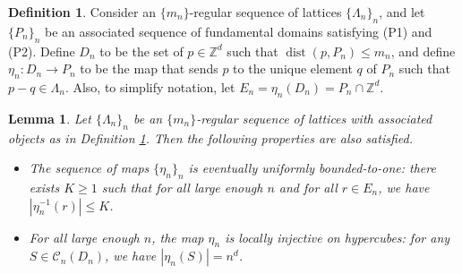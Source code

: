 \documentclass[12pt]{amsart}
\newtheorem{lemma}[theorem]{Lemma}
\theoremstyle{definition}
\newtheorem{definition}[theorem]{Definition}
\def\Z{\mathbb{Z}}
\DeclareMathOperator{\dist}{dist}
\begin{document}
\begin{definition} \label{Defn:Roy}
Consider an $\{m_n\}$-regular sequence of lattices $\{\Lambda_n\}_n$, and let $\{P_n\}_n$ be an associated sequence of fundamental domains satisfying (P1) and (P2).
Define $D_n$ to be the set of $p \in \Z^d$ such that $\dist(p,P_n) \leq m_n$, and define $\eta_n : D_n \to P_n$ to be the map that sends $p$ to the unique element $q$ of $P_n$ such that $p - q \in \Lambda_n$.
Also, to simplify notation, let $E_n = \eta_n(D_n) = P_n \cap \Z^d$.
\end{definition}

\begin{lemma} 
Let $\{\Lambda_n\}_n$ be an $\{m_n\}$-regular sequence of lattices with associated objects as in Definition \ref{Defn:Roy}. Then the following properties are also satisfied.
\begin{itemize}
\item[(P5)] The sequence of maps $\{\eta_n\}_n$ is eventually uniformly bounded-to-one: there exists $K \geq 1$ such that for all large enough $n$ and for all $r \in E_n$, we have $|\eta_n^{-1}(r)| \leq K$.
\item[(P6)] For all large enough $n$, the map $\eta_n$ is locally injective on hypercubes: for any $S \in \mathcal{C}_n(D_n)$, we have $|\eta_n(S)| = n^d$.
\end{itemize}
\end{lemma}
\end{document}
